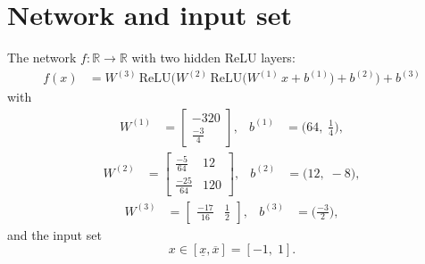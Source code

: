 \documentclass[11pt]{article}
\begin{document}
\section{Network and input set}
The network $f:\mathbb{R} \to \mathbb{R}$ with two hidden ReLU layers:
\begin{align*}
f(x) &= W^{(3)}\,\mathrm{ReLU}\bigl(W^{(2)}\,\mathrm{ReLU}\bigl(W^{(1)}\,x + b^{(1)}\bigr) + b^{(2)}\bigr) + b^{(3)}
\end{align*}
with
\begin{align*}
W^{(1)} &= \begin{bmatrix}
-320 \\
\frac{-3}{4}
\end{bmatrix}, & b^{(1)} &= \bigl(64,\; \frac{1}{4}\bigr),
\end{align*}
\begin{align*}
W^{(2)} &= \begin{bmatrix}
\frac{-5}{64} & 12 \\
\frac{-25}{64} & 120
\end{bmatrix}, & b^{(2)} &= \bigl(12,\; -8\bigr),
\end{align*}
\begin{align*}
W^{(3)} &= \begin{bmatrix}
\frac{-17}{16} & \frac{1}{2}
\end{bmatrix}, & b^{(3)} &= \bigl(\frac{-3}{2}\bigr),
\end{align*}
and the input set
\begin{equation*}
 x \in [\underline{x}, \overline{x}] = [-1,\; 1].
\end{equation*}
\end{document}
